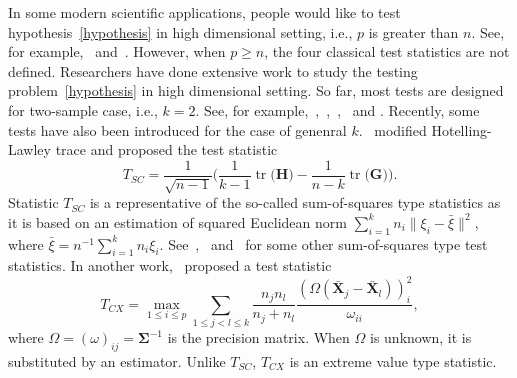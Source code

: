 \documentclass[12pt]{article} %
\DeclareMathOperator{\mytr}{tr}
\newcommand{\bX}{\mathbf{X}}
\newcommand{\bH}{\mathbf{H}}
\newcommand{\bG}{\mathbf{G}}
\newcommand{\bfsym}[1]{\ensuremath{\boldsymbol{#1}}}
\def\bSigma {\bfsym {\Sigma}}
\theoremstyle{definition}
\begin{document}
In some modern scientific applications, people would like to test hypothesis~\eqref{hypothesis} in high dimensional setting, i.e., $p$ is greater than $n$.
See, for example,~\citet{Verstynen1209} and~\citet{Tsai2009}.
However, when $p\geq n$, the four classical test statistics are not defined.
  Researchers have done extensive work to study the testing problem~\eqref{hypothesis} in high dimensional setting.
 So far, most tests are designed for two-sample case, i.e., $k=2$.
  See, for example,~\citet{Bai1996Efiect},~\cite{Srivastava2007Multivariate},~\citet{Chen2010A},~\citet{Tony2013} and \citet{Feng2014Two}.
  Recently, some tests have also been introduced for the case of genenral $k$.~\cite{Schott2007Some} modified Hotelling-Lawley trace and proposed the test statistic
  $$
  T_{SC}=\frac{1}{\sqrt{n-1}}\Big(
  \frac{1}{k-1}\mytr\big(\bH\big)-\frac{1}{n-k}\mytr\big(\bG\big)
  \Big).
  $$
Statistic $T_{SC}$ is a representative of the so-called sum-of-squares type statistics as it is based on an estimation of squared Euclidean norm $\sum_{i=1}^k n_i\|\xi_i-\bar{\xi}\|^2$, where $\bar{\xi}=n^{-1}\sum_{i=1}^k n_i \xi_i$.
See~\cite{Srivastava2013},~\cite{Yamada2015} and~\cite{Chang2017} for some other sum-of-squares type test statistics.
In another work,~\cite{Cai2014High} proposed a test statistic 
  $$
  T_{CX}=\max_{1\leq i\leq p} \sum_{1\leq j<l\leq k}\frac{n_j n_l}{n_j+n_l}\frac{(\Omega(\bar{\bX}_j-\bar{\bX}_l))_i^2}{\omega_{ii}},
  $$
  where $\Omega=(\omega)_{ij}=\bSigma^{-1}$ is the precision matrix. When $\Omega$ is unknown, it is substituted by an estimator.
  Unlike $T_{SC}$, $T_{CX}$ is an extreme value type statistic.
  
\end{document}
